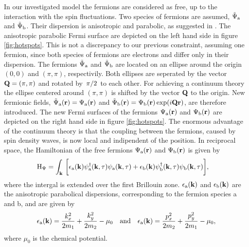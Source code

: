 In our investigated model the fermions are considered as free, up to the interaction with the spin fluctuations.
Two species of fermions are assumed, $\tilde{\Psi}_{\mathrm{a}}$ and $\tilde{\Psi}_{\mathrm{b}}$. 
Their dispersion is anisotropic and parabolic, as suggested in \cite{Patel&Sachdev}. 
The anisotropic parabolic Fermi surface are depicted on the left hand side in figure \ref{fig:hotspots}.
This is not a discrepancy to our previous constraint, assuming one fermion, since both species of fermions are electrons and differ only in their dispersion.
The fermions $\tilde{\Psi}_{\mathrm{a}}$ and $\tilde{\Psi}_{\mathrm{b}}$ are located on an ellipse around the origin $(0,0)$ and $(\pi,\pi)$, respectivily.
Both ellipses are seperated by the vector $\vb{Q} = (\pi,\pi)$ and rotated by $\flatfrac{\pi}{2}$ to each other.
For achieving a continuum theory the ellipse centered around $(\pi,\pi)$ is shifted by the vector $\vb{Q}$ to the origin.
New fermionic fields, $\tilde{\Psi}_{\mathrm{a}}(\vb{r}) = \Psi_{\mathrm{a}}(\vb{r})$ and $\tilde{\Psi}_{\mathrm{b}}(\vb{r}) = \Psi_{\mathrm{b}}(\vb{r}) \exp(i\vb{Q}\vb{r})$, are therefore introduced.
The new Fermi surfaces of the fermions $\Psi_{\mathrm{a}}(\vb{r})$ and $\Psi_{\mathrm{b}}(\vb{r})$ are depicted on the right hand side in figure \ref{fig:hotspots}.
The enormous advantage of the continuum theory is that the coupling between the fermions, caused by spin density waves, is now local and indipendent of the position.
In reciprocal space, the Hamiltonian of the free fermions $\Psi_{\mathrm{a}}(\vb{r})$ and $\Psi_{\mathrm{b}}(\vb{r})$ is given by
%
\begin{align}
	\mathrm{H}_{\Psi} &= 
	 	\int_{\vb{k}}\,
	 	\bigg[
	 		\epsilon_{\mathrm{a}}(\vb{k})
	 		\psi_{\mathrm{a}}^{\dag}(\vb{k},\tau)
	 		\psi_{\mathrm{a}}(\vb{k},\tau)
	 		+
	 		\epsilon_{\mathrm{b}}(\vb{k})
	 		\psi_{\mathrm{b}}^{\dag}(\vb{k},\tau)
	 		\psi_{\mathrm{b}}(\vb{k},\tau)
	 	\bigg],
	 \label{eq:Hamiltonian electrons}
\end{align}
%
where the intergal is extended over the first Brillouin zone.
$\epsilon_{\mathrm{a}}(\vb{k})$ and $\epsilon_{\mathrm{b}}(\vb{k})$ are the anisotropic parabolical dispersions, corresponding to the fermion species a and b, and are given by
%
\begin{align}
	\epsilon_{\mt{a}}(\vb{k}) = \frac{k_{x}^{2}}{2m_{1}} + \frac{k_{y}^{2}}{2m_{2}} - \mu_{0}
	\qq{and}
	\epsilon_{\mt{a}}(\vb{k}) = \frac{p_{x}^{2}}{2m_{2}} + \frac{p_{y}^{2}}{2m_{1}} - \mu_{0},
	\label{eq:dispersion relations}
\end{align}
%
where $\mu_{0}$ is the chemical potential.
%
%

